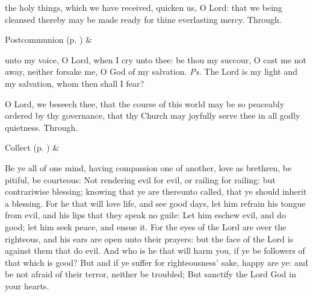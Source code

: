 
\postcommunion
{} the holy things, which we have received, quicken us, O Lord: that we being cleansed thereby may be made ready for thine everlasting mercy. Through.
\begin{rubric}
     Postcommunion  (p. \pageref{SPSaints}) \&  
\end{rubric}


\clearpage
{}


\introit
{} unto my voice, O Lord, when I cry unto thee: be thou my succour, O cast me not away, neither forsake me, O God of my salvation. \textit{Ps.} The Lord is my light and my salvation, whom then shall I fear?

\collect
{} O Lord, we beseech thee, that the course of this world may be so peaceably ordered by thy governance, that thy Church may joyfully serve thee in all godly quietness. Through.
\begin{rubric}
     Collect  (p. \pageref{SPSaints}) \&  
\end{rubric}

 Be ye all of one mind, having compassion one of another, love as brethren, be pitiful, be courteous: Not rendering evil for evil, or railing for railing: but contrariwise blessing; knowing that ye are thereunto called, that ye should inherit a blessing. For he that will love life, and see good days, let him refrain his tongue from evil, and his lips that they speak no guile: Let him eschew evil, and do good; let him seek peace, and ensue it. For the eyes of the Lord are over the righteous, and his ears are open unto their prayers: but the face of the Lord is against them that do evil. And who is he that will harm you, if ye be followers of that which is good? But and if ye suffer for righteousness' sake, happy are ye: and be not afraid of their terror, neither be troubled; But sanctify the Lord God in your hearts.

